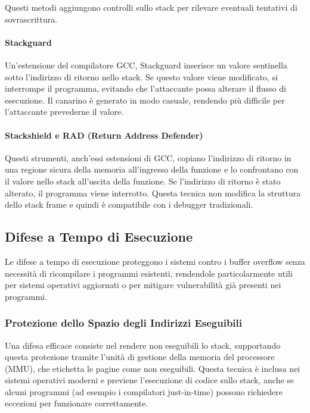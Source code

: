 Questi metodi aggiungono controlli sullo stack per rilevare eventuali tentativi di sovrascrittura.

\paragraph{Stackguard}

Un'estensione del compilatore GCC, Stackguard inserisce un valore sentinella sotto l'indirizzo di ritorno nello stack. Se questo valore viene modificato, si interrompe il programma, evitando che l'attaccante possa alterare il flusso di esecuzione. Il canarino è generato in modo casuale, rendendo più difficile per l'attaccante prevederne il valore.

\paragraph{Stackshield e RAD (Return Address Defender)}

Questi strumenti, anch'essi estensioni di GCC, copiano l'indirizzo di ritorno in una regione sicura della memoria all'ingresso della funzione e lo confrontano con il valore nello stack all'uscita della funzione. Se l'indirizzo di ritorno è stato alterato, il programma viene interrotto. Questa tecnica non modifica la struttura dello stack frame e quindi è compatibile con i debugger tradizionali.

\subsection{Difese a Tempo di Esecuzione}

Le difese a tempo di esecuzione proteggono i sistemi contro i buffer overflow senza necessità di ricompilare i programmi esistenti, rendendole particolarmente utili per sistemi operativi aggiornati o per mitigare vulnerabilità già presenti nei programmi.

\subsubsection{Protezione dello Spazio degli Indirizzi Eseguibili}

Una difesa efficace consiste nel rendere non eseguibili lo stack, supportando questa protezione tramite l'unità di gestione della memoria del processore (MMU), che etichetta le pagine come non eseguibili. Questa tecnica è inclusa nei sistemi operativi moderni e previene l'esecuzione di codice sullo stack, anche se alcuni programmi (ad esempio i compilatori just-in-time) possono richiedere eccezioni per funzionare correttamente.

